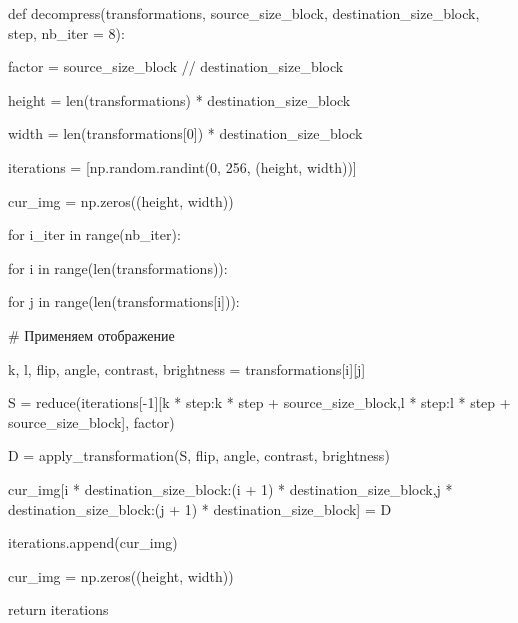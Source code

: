\documentclass{article}
\begin{document}
{
def decompress(transformations, source\_size\_block, destination\_size\_block, step, nb\_iter = 8):

\hspace{1cm}	factor = source\_size\_block // destination\_size\_block

\hspace{1cm}	height = len(transformations) * destination\_size\_block

\hspace{1cm}	width = len(transformations[0]) * destination\_size\_block

\hspace{1cm}	iterations = [np.random.randint(0, 256, (height, width))]

\hspace{1cm}	cur\_img = np.zeros((height, width))

\hspace{1cm}	for i\_iter in range(nb\_iter):

\hspace{2cm}		for i in range(len(transformations)):

\hspace{3cm}			for j in range(len(transformations[i])):

\hspace{4cm}				\# Применяем отображение

\hspace{4cm}				k, l, flip, angle, contrast, brightness = transformations[i][j]

\hspace{4cm}				S = reduce(iterations[-1][k * step:k * step + source\_size\_block,l * step:l * step + source\_size\_block], factor)

\hspace{4cm}				D = apply\_transformation(S, flip, angle, contrast, brightness)

\hspace{4cm}				cur\_img[i * destination\_size\_block:(i + 1) * destination\_size\_block,j * destination\_size\_block:(j + 1) * destination\_size\_block] = D

\hspace{2cm}		iterations.append(cur\_img)

\hspace{2cm}		cur\_img = np.zeros((height, width))

\hspace{1cm}	return iterations
}
\vspace{1em}
\end{document}
